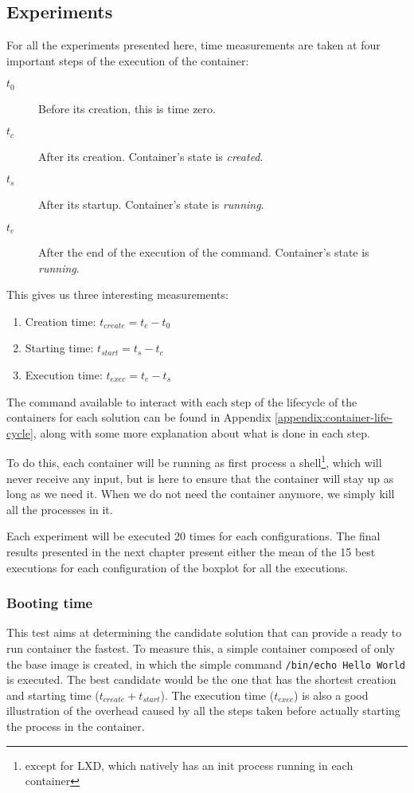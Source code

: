 \subsection{Experiments} \label{subs:experiments}
For all the experiments presented here, time measurements are taken at four important steps of the execution of the container:
\begin{description}
  \item[$t_0$] Before its creation, this is time zero.
  \item[$t_c$] After its creation. Container's state is \textit{created}.
  \item[$t_s$] After its startup. Container's state is \textit{running}.
  \item[$t_e$] After the end of the execution of the command. Container's state is \textit{running}.
\end{description}
This gives us three interesting measurements:
\begin{enumerate}
  \item Creation time: $t_{create}=t_c - t_0$
  \item Starting time: $t_{start}=t_s - t_c$
  \item Execution time: $t_{exec}=t_e - t_s$
\end{enumerate}

The command available to interact with each step of the lifecycle of the containers for each solution can be found in Appendix \ref{appendix:container-life-cycle}, along with some more explanation about what is done in each step.

To do this, each container will be running as first process a shell\footnote{except for LXD, which natively has an init process running in each container}, which will never receive any input, but is here to ensure that the container will stay up as long as we need it.  When we do not need the container anymore, we simply kill all the processes in it.

Each experiment will be executed 20 times for each configurations.  The final results presented in the next chapter present either the mean of the 15 best executions for each configuration of the boxplot for all the executions.

\subsubsection{Booting time}
This test aims at determining the candidate solution that can provide a ready to run container the fastest.  To measure this, a simple container composed of only the base image is created, in which the simple command \texttt{/bin/echo Hello World} is executed.  The best candidate would be the one that has the shortest creation and starting time ($t_{create} + t_{start}$).  The execution time ($t_{exec}$) is also a good illustration of the overhead caused by all the steps taken before actually starting the process in the container.

